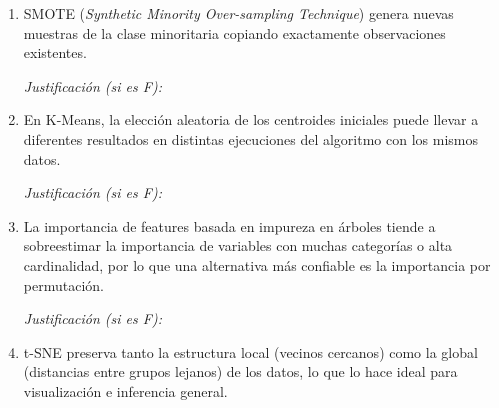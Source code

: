 \documentclass[11pt,a4paper]{article}
\begin{document}
\begin{enumerate}[label=\textbf{\arabic*.}, leftmargin=*, itemsep=18pt]

\item \underline{\hspace{1cm}} SMOTE (\textit{Synthetic Minority Over-sampling Technique}) genera nuevas muestras de la clase minoritaria copiando exactamente observaciones existentes.

\vspace{0.5cm}
\noindent\textit{Justificaci\'on (si es F):} \underline{\hspace{12cm}}

\vspace{0.2cm}
\underline{\hspace{14cm}}

\item \underline{\hspace{1cm}} En K-Means, la elecci\'on aleatoria de los centroides iniciales puede llevar a diferentes resultados en distintas ejecuciones del algoritmo con los mismos datos.

\vspace{0.5cm}
\noindent\textit{Justificaci\'on (si es F):} \underline{\hspace{12cm}}

\vspace{0.2cm}
\underline{\hspace{14cm}}

\item \underline{\hspace{1cm}} La importancia de features basada en impureza en \'arboles tiende a sobreestimar la importancia de variables con muchas categor\'ias o alta cardinalidad, por lo que una alternativa m\'as confiable es la importancia por permutaci\'on.

\vspace{0.5cm}
\noindent\textit{Justificaci\'on (si es F):} \underline{\hspace{12cm}}

\vspace{0.2cm}
\underline{\hspace{14cm}}

\item \underline{\hspace{1cm}} t-SNE preserva tanto la estructura local (vecinos cercanos) como la global (distancias entre grupos lejanos) de los datos, lo que lo hace ideal para visualizaci\'on e inferencia general.


\end{enumerate}
\end{document}
